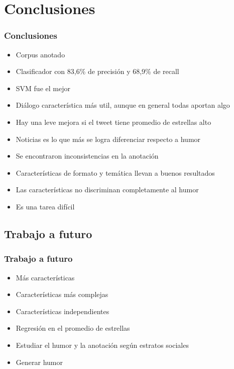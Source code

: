 \section{Conclusiones}

\begin{frame}
    \frametitle{Conclusiones}
    
    \begin{itemize}
    	\item[\checkmark] Corpus anotado
    	\item[\checkmark] Clasificador con 83,6\% de precisión y 68,9\% de recall
    	\item[\checkmark] SVM fue el mejor
    	\item[\checkmark] Diálogo característica más util, aunque en general todas aportan algo
    	\item[\checkmark] Hay una leve mejora si el tweet tiene promedio de estrellas alto
    	\item[\checkmark] Noticias es lo que más se logra diferenciar respecto a humor
    	\item[\checkmark] Se encontraron inconsistencias en la anotación
        \item[\checkmark] Características de formato y temática llevan a buenos resultados
    	\item[\checkmark] Las características no discriminan completamente al humor
    	\item[\checkmark] Es una tarea difícil
    \end{itemize}
\end{frame}

\subsection{Trabajo a futuro}
\begin{frame}
    \frametitle{Trabajo a futuro}
    
    \begin{itemize}
        \item Más características
    	\item Características más complejas
    	\item Características independientes
    	\item Regresión en el promedio de estrellas
    	\item Estudiar el humor y la anotación según estratos sociales
        \item Generar humor
    \end{itemize}
\end{frame}

